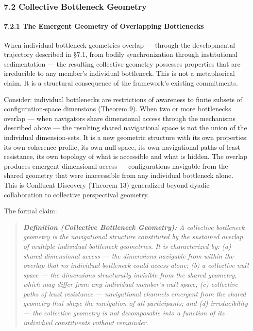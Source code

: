 \bigskip\noindent\makebox[\textwidth]{\color{rulegray}\rule{5cm}{0.3pt}}\bigskip


\subsubsection*{7.2 Collective Bottleneck Geometry}


\paragraph*{7.2.1 The Emergent Geometry of Overlapping Bottlenecks}


When individual bottleneck geometries overlap — through the developmental trajectory described in §7.1, from bodily synchronization through institutional sedimentation — the resulting collective geometry possesses properties that are irreducible to any member's individual bottleneck. This is not a metaphorical claim. It is a structural consequence of the framework's existing commitments.


Consider: individual bottlenecks are restrictions of awareness to finite subsets of configuration-space dimensions (Theorem 9). When two or more bottlenecks overlap — when navigators share dimensional access through the mechanisms described above — the resulting shared navigational space is not the union of the individual dimension-sets. It is a new geometric structure with its own properties: its own coherence profile, its own null space, its own navigational paths of least resistance, its own topology of what is accessible and what is hidden. The overlap produces emergent dimensional access — configurations navigable from the shared geometry that were inaccessible from any individual bottleneck alone. This is Confluent Discovery (Theorem 13) generalized beyond dyadic collaboration to collective perspectival geometry.


The formal claim:


\begin{quote}
\itshape
\textbf{Definition (Collective Bottleneck Geometry):} \textit{A collective bottleneck geometry is the navigational structure constituted by the sustained overlap of multiple individual bottleneck geometries. It is characterized by: (a) shared dimensional access — the dimensions navigable from within the overlap that no individual bottleneck could access alone; (b) a collective null space — the dimensions structurally invisible from the shared geometry, which may differ from any individual member's null space; (c) collective paths of least resistance — navigational channels emergent from the shared geometry that shape the navigation of all participants; and (d) irreducibility — the collective geometry is not decomposable into a function of its individual constituents without remainder.}
\end{quote}


